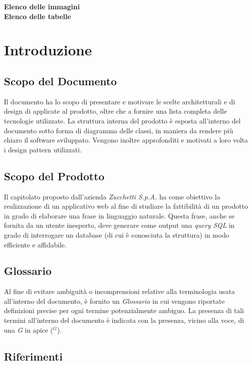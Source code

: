\documentclass[5pt]{article}
\begin{document}
	\pagebreak
	\tableofcontents
	\pagebreak
	\textbf{\Large Elenco delle immagini} \\
	
	\pagebreak
	\textbf{\Large Elenco delle tabelle} \\
	\makeatletter
	\makeatother
	\pagebreak
	
	\section{Introduzione}
	
	\subsection{Scopo del Documento}

    Il documento ha lo scopo di presentare e motivare le scelte architetturali e di design di applicate al prodotto, oltre che a fornire una lista completa delle tecnologie utilizzate. La struttura interna del prodotto è esposta all'interno del documento sotto forma di diagramma delle classi, in maniera da rendere più chiaro il software sviluppato. Vengono inoltre approfonditi e motivati a loro volta i design pattern utilizzati. 
	
	\subsection{Scopo del Prodotto}
    Il capitolato proposto dall'azienda \textit{Zucchetti S.p.A.} ha come obiettivo la realizzazione di un applicativo web al fine di studiare la fattibilità di un prodotto in grado di elaborare una frase in linguaggio naturale. Questa frase, anche se fornita da un utente inesperto, deve generare come output una \textit{query SQL} in grado di interrogare un database (di cui è conosciuta la struttura) in modo efficiente e affidabile.
	
	\subsection{Glossario}
    Al fine di evitare ambiguità o incomprensioni relative alla terminologia usata all'interno del documento, è fornito un \textit{Glossario} in cui vengono riportate definizioni precise per ogni termine potenzialmente ambiguo. La presenza di tali termini all'interno del documento è indicata con la presenza, vicino alla voce, di una \textit{G} in apice ($^G$). 
	\subsection{Riferimenti}
\end{document}
